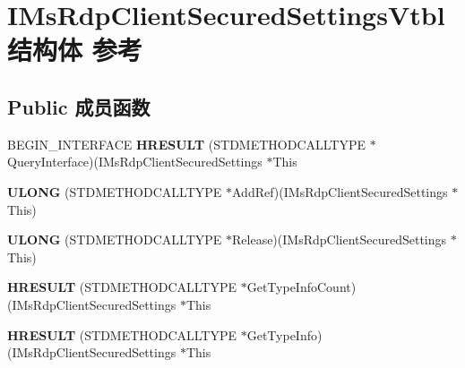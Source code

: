 \hypertarget{struct_i_ms_rdp_client_secured_settings_vtbl}{}\section{I\+Ms\+Rdp\+Client\+Secured\+Settings\+Vtbl结构体 参考}
\label{struct_i_ms_rdp_client_secured_settings_vtbl}
\subsection*{Public 成员函数}
\begin{DoxyCompactItemize}
\item 
\mbox{\label{struct_i_ms_rdp_client_secured_settings_vtbl_aeab30069368ed9b4132cd1d2942e7143}} 
B\+E\+G\+I\+N\+\_\+\+I\+N\+T\+E\+R\+F\+A\+CE {\bfseries H\+R\+E\+S\+U\+LT} (S\+T\+D\+M\+E\+T\+H\+O\+D\+C\+A\+L\+L\+T\+Y\+PE $\ast$Query\+Interface)(I\+Ms\+Rdp\+Client\+Secured\+Settings $\ast$This
\item 
\mbox{\label{struct_i_ms_rdp_client_secured_settings_vtbl_a1850346ab2ec35defb0a23e0095edaaf}} 
{\bfseries U\+L\+O\+NG} (S\+T\+D\+M\+E\+T\+H\+O\+D\+C\+A\+L\+L\+T\+Y\+PE $\ast$Add\+Ref)(I\+Ms\+Rdp\+Client\+Secured\+Settings $\ast$This)
\item 
\mbox{\label{struct_i_ms_rdp_client_secured_settings_vtbl_a8cbebbf9dd7b3f0bfeae82fb8ec6cf0f}} 
{\bfseries U\+L\+O\+NG} (S\+T\+D\+M\+E\+T\+H\+O\+D\+C\+A\+L\+L\+T\+Y\+PE $\ast$Release)(I\+Ms\+Rdp\+Client\+Secured\+Settings $\ast$This)
\item 
\mbox{\label{struct_i_ms_rdp_client_secured_settings_vtbl_a44af3537f36c8eaa0b3db8f08cb6388c}} 
{\bfseries H\+R\+E\+S\+U\+LT} (S\+T\+D\+M\+E\+T\+H\+O\+D\+C\+A\+L\+L\+T\+Y\+PE $\ast$Get\+Type\+Info\+Count)(I\+Ms\+Rdp\+Client\+Secured\+Settings $\ast$This
\item 
\mbox{\label{struct_i_ms_rdp_client_secured_settings_vtbl_a0d45bf17bf27d67d550c11fcafdd2d6c}} 
{\bfseries H\+R\+E\+S\+U\+LT} (S\+T\+D\+M\+E\+T\+H\+O\+D\+C\+A\+L\+L\+T\+Y\+PE $\ast$Get\+Type\+Info)(I\+Ms\+Rdp\+Client\+Secured\+Settings $\ast$This

\end{DoxyCompactItemize}
